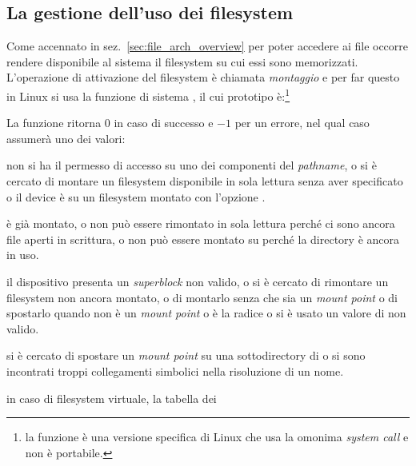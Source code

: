 \subsection{La gestione dell'uso dei filesystem}
\label{sec:filesystem_mounting}

Come accennato in sez.~\ref{sec:file_arch_overview} per poter accedere ai file
occorre rendere disponibile al sistema il filesystem su cui essi sono
memorizzati. L'operazione di attivazione del filesystem è chiamata
\textsl{montaggio} e per far questo in Linux si usa la funzione di sistema
, il cui prototipo è:\footnote{la funzione è una versione
  specifica di Linux che usa la omonima \textit{system call} e non è
  portabile.}

\begin{funcproto}{
}
{La funzione ritorna $0$ in caso di successo e $-1$ per un errore, nel qual
  caso  assumerà uno dei valori:
  \begin{errlist}
  \item[\errcode{EACCES}] non si ha il permesso di accesso su uno dei
    componenti del \textit{pathname}, o si è cercato di montare un filesystem
    disponibile in sola lettura senza aver specificato  o il
    device  è su un filesystem montato con l'opzione
    .
  \item[\errcode{EBUSY}]  è già montato, o non può essere
    rimontato in sola lettura perché ci sono ancora file aperti in scrittura,
    o non può essere montato su  perché la directory è ancora in
    uso.
  \item[\errcode{EINVAL}] il dispositivo  presenta un
    \textit{superblock} non valido, o si è cercato di rimontare un filesystem
    non ancora montato, o di montarlo senza che  sia un
    \textit{mount point} o di spostarlo quando  non è un
    \textit{mount point} o è la radice o si è usato un valore di
     non valido.
  \item[\errcode{ELOOP}] si è cercato di spostare un \textit{mount point} su
    una sottodirectory di  o si sono incontrati troppi
    collegamenti simbolici nella risoluzione di un nome.
  \item[\errcode{EMFILE}] in caso di filesystem virtuale, la tabella dei

\end{errlist}}
\end{funcproto}
